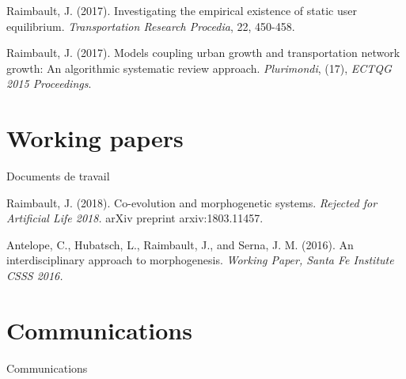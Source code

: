 \bigskip

\noindent Raimbault, J. (2017). Investigating the empirical existence of static user equilibrium. \textit{Transportation Research Procedia}, 22, 450-458. 

\bigskip

\noindent Raimbault, J. (2017). Models coupling urban growth and transportation network growth: An algorithmic systematic review approach. \textit{Plurimondi}, (17), \textit{ECTQG 2015 Proceedings}.






\section*{Working papers}{Documents de travail}


\noindent Raimbault, J. (2018). Co-evolution and morphogenetic systems. \textit{Rejected for Artificial Life 2018.} arXiv preprint arxiv:1803.11457.










\bigskip

\noindent Antelope, C., Hubatsch, L., Raimbault, J., and Serna, J. M. (2016). An interdisciplinary approach to morphogenesis. \textit{Working Paper, Santa Fe Institute CSSS 2016.}





\section*{Communications}{Communications}


